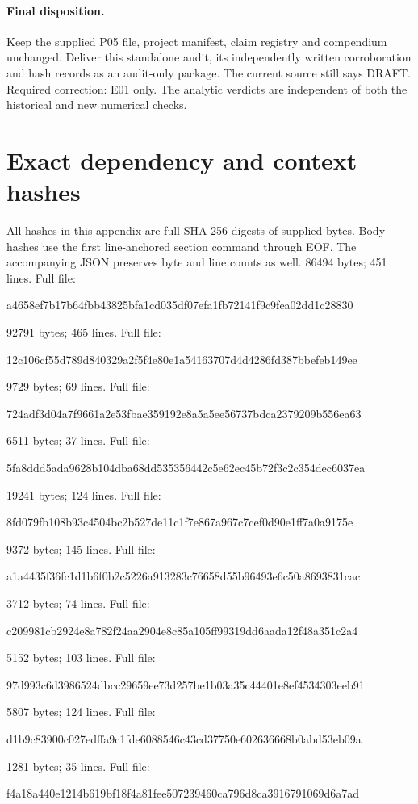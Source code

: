\documentclass[11pt]{article}
\newcommand{\sha}[2]{\par{\small\ttfamily #1\allowbreak #2}\par}
\begin{document}
\paragraph{Final disposition.}
Keep the supplied P05 file, project manifest, claim registry and compendium
unchanged. Deliver this standalone audit, its independently written
corroboration and hash records as an audit-only package. The current
source still says DRAFT. Required correction: E01 only. The analytic
verdicts are independent of both the historical and new numerical checks.

\appendix
\section{Exact dependency and context hashes}
All hashes in this appendix are full SHA-256 digests of supplied bytes. Body hashes use the first line-anchored section command through EOF. The accompanying JSON preserves byte and line counts as well.
\medskip\noindent\textbf{}
86494 bytes; 451 lines. Full file:
\sha{a4658ef7b17b64fbb43825bfa1cd035d}{f07efa1fb72141f9c9fea02dd1c28830}
\medskip\noindent\textbf{}
92791 bytes; 465 lines. Full file:
\sha{12c106cf55d789d840329a2f5f4e80e1}{a54163707d4d4286fd387bbefeb149ee}
\medskip\noindent\textbf{}
9729 bytes; 69 lines. Full file:
\sha{724adf3d04a7f9661a2e53fbae359192}{e8a5a5ee56737bdca2379209b556ea63}
\medskip\noindent\textbf{}
6511 bytes; 37 lines. Full file:
\sha{5fa8ddd5ada9628b104dba68dd535356}{442c5e62ec45b72f3c2c354dec6037ea}
\medskip\noindent\textbf{}
19241 bytes; 124 lines. Full file:
\sha{8fd079fb108b93c4504bc2b527de11c1}{f7e867a967c7cef0d90e1ff7a0a9175e}
\medskip\noindent\textbf{}
9372 bytes; 145 lines. Full file:
\sha{a1a4435f36fc1d1b6f0b2c5226a91328}{3c76658d55b96493e6c50a8693831cac}
\medskip\noindent\textbf{}
3712 bytes; 74 lines. Full file:
\sha{c209981cb2924e8a782f24aa2904e8c8}{5a105ff99319dd6aada12f48a351c2a4}
\medskip\noindent\textbf{}
5152 bytes; 103 lines. Full file:
\sha{97d993c6d3986524dbcc29659ee73d25}{7be1b03a35c44401e8ef4534303eeb91}
\medskip\noindent\textbf{}
5807 bytes; 124 lines. Full file:
\sha{d1b9c83900c027edffa9c1fde6088546}{c43cd37750e602636668b0abd53eb09a}
\medskip\noindent\textbf{}
1281 bytes; 35 lines. Full file:
\sha{f4a18a440e1214b619bf18f4a81fee50}{7239460ca796d8ca3916791069d6a7ad}
\end{document}

